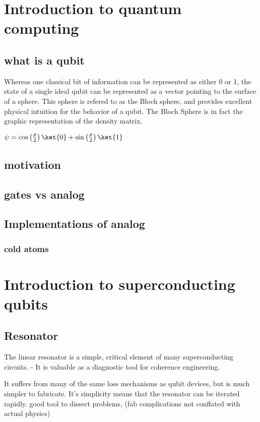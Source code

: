 \chapter{Introduction to quantum computing}
\section{what is a qubit}

Whereas one classical bit of information can be represented as either 0 or 1, the state of a single ideal qubit can be represented as a vector pointing to the surface of a sphere.
This sphere is refered to as the Bloch sphere, and provides excellent physical intuition for the behavior of a qubit.
The Bloch Sphere is in fact the graphic representation of the density matrix.

$\psi = \cos \left( \frac{\theta}{2} \right) \ket{0} + \sin \left( \frac{\theta}{2} \right)\ket{1} $


\section{motivation}
\section{gates vs analog}
\section{Implementations of analog}
\subsection{cold atoms}

\chapter{Introduction to superconducting qubits}
\section{Resonator}
The linear resonator is a simple, critical element of many superconducting circuits.
- It is valuable as a diagnostic tool for coherence engineering.

It suffers from many of the same loss mechanisms as qubit devices, but is much simpler to fabricate.
It's simplicity means that the resonator can be iterated rapidly.
good tool to dissect problems, (fab complications not conflated with actual physics)

